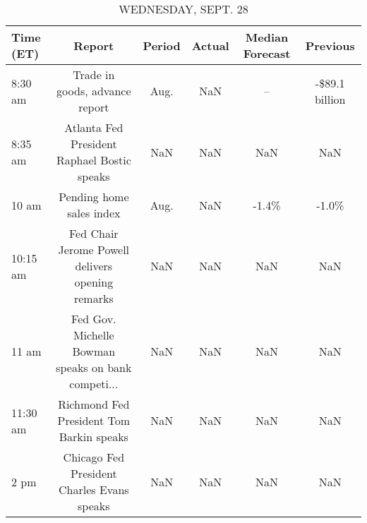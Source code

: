 \documentclass{article}%
\begin{document}
\begin{table}[htbp]%
\caption{WEDNESDAY, SEPT. 28}%
\centering%
\begin{adjustbox}{width=1\textwidth}%
\begin{tabular}{lccccc}
\toprule
Time (ET) &                                             Report & Period & Actual & Median Forecast &       Previous \\
\midrule
  8:30 am &                     Trade in goods, advance report &   Aug. &    NaN &              -- & -\$89.1 billion \\
  8:35 am &        Atlanta Fed President Raphael Bostic speaks &    NaN &    NaN &             NaN &            NaN \\
    10 am &                           Pending home sales index &   Aug. &    NaN &           -1.4\% &          -1.0\% \\
 10:15 am &   Fed Chair Jerome Powell delivers opening remarks &    NaN &    NaN &             NaN &            NaN \\
    11 am & Fed Gov. Michelle Bowman speaks on bank competi... &    NaN &    NaN &             NaN &            NaN \\
 11:30 am &           Richmond Fed President Tom Barkin speaks &    NaN &    NaN &             NaN &            NaN \\
     2 pm &         Chicago Fed President Charles Evans speaks &    NaN &    NaN &             NaN &            NaN \\
\bottomrule
\end{tabular}
%
\end{adjustbox}%
\end{table}

%
\end{document}
